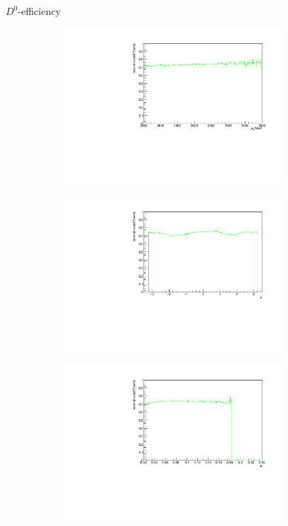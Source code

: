 \documentclass[11pt]{beamer}
\begin{document}
\begin{frame}{$D^0$-efficiency}
\begin{figure}
\begin{subfigure}{0.45\textwidth}
\includegraphics[width=0.9\textwidth]{up_pdf/single/tot/h_pt_reco_D0.pdf}
\end{subfigure}
\begin{subfigure}{0.45\textwidth}
\includegraphics[width=0.9\textwidth]{up_pdf/single/tot/h_phi_reco_D0.pdf}
\end{subfigure}
\begin{subfigure}{0.45\textwidth}
\includegraphics[width=0.9\textwidth]{up_pdf/single/tot/h_theta_reco_D0.pdf}

\end{subfigure}
\end{figure}
\end{frame}
\end{document}
